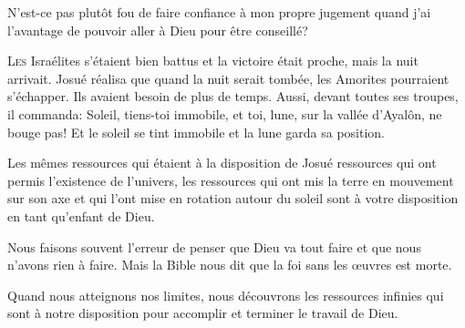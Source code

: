 N'est-ce pas plutôt fou de faire confiance à mon propre jugement
 quand j'ai l'avantage de pouvoir aller à Dieu pour être conseillé? 

\dvrule







\lettrine{L}{es} Israélites s'étaient bien battus
 et la victoire était proche, mais la nuit arrivait.
 Josué réalisa que quand la nuit serait tombée,
 les Amorites pourraient s'échapper. Ils avaient besoin de plus de temps.
 Aussi, devant toutes ses troupes, il commanda:
 \Og Soleil, tiens-toi immobile, et toi, lune, sur la vallée d'Ayalôn,
 ne bouge pas! \Fg{}
 Et le soleil se tint immobile et la lune garda sa position.

Les mêmes ressources qui étaient à la disposition de Josué
 \ocadr ressources qui ont permis l'existence de l'univers,
 les ressources qui ont mis la terre en mouvement sur son axe
 et qui l'ont mise en rotation autour du soleil \fcadr{}
 sont à votre disposition en tant qu'enfant de Dieu.

Nous faisons souvent l'erreur de penser que Dieu va tout faire
 et que nous n'avons rien à faire.
 Mais la Bible nous dit que la foi sans les \oe{}uvres est morte.



Quand nous atteignons nos limites, nous découvrons les ressources infinies
 qui sont à notre disposition pour accomplir et terminer le travail de Dieu.

\dvrule

